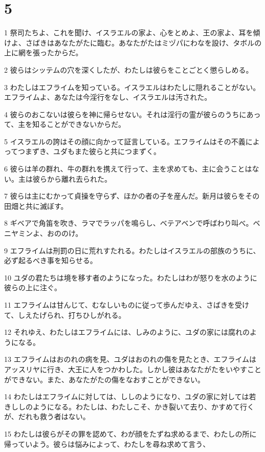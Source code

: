 \chapter{5}

\par 1 祭司たちよ、これを聞け、イスラエルの家よ、心をとめよ、王の家よ、耳を傾けよ、さばきはあなたがたに臨む。あなたがたはミヅパにわなを設け、タボルの上に網を張ったからだ。
\par 2 彼らはシッテムの穴を深くしたが、わたしは彼らをことごとく懲らしめる。
\par 3 わたしはエフライムを知っている。イスラエルはわたしに隠れることがない。エフライムよ、あなたは今淫行をなし、イスラエルは汚された。
\par 4 彼らのおこないは彼らを神に帰らせない。それは淫行の霊が彼らのうちにあって、主を知ることができないからだ。
\par 5 イスラエルの誇はその顔に向かって証言している。エフライムはその不義によってつまずき、ユダもまた彼らと共につまずく。
\par 6 彼らは羊の群れ、牛の群れを携えて行って、主を求めても、主に会うことはない。主は彼らから離れ去られた。
\par 7 彼らは主にむかって貞操を守らず、ほかの者の子を産んだ。新月は彼らをその田畑と共に滅ぼす。
\par 8 ギベアで角笛を吹き、ラマでラッパを鳴らし、ベテアベンで呼ばわり叫べ。ベニヤミンよ、おののけ。
\par 9 エフライムは刑罰の日に荒れすたれる。わたしはイスラエルの部族のうちに、必ず起るべき事を知らせる。
\par 10 ユダの君たちは境を移す者のようになった。わたしはわが怒りを水のように彼らの上に注ぐ。
\par 11 エフライムは甘んじて、むなしいものに従って歩んだゆえ、さばきを受けて、しえたげられ、打ちひしがれる。
\par 12 それゆえ、わたしはエフライムには、しみのように、ユダの家には腐れのようになる。
\par 13 エフライムはおのれの病を見、ユダはおのれの傷を見たとき、エフライムはアッスリヤに行き、大王に人をつかわした。しかし彼はあなたがたをいやすことができない。また、あなたがたの傷をなおすことができない。
\par 14 わたしはエフライムに対しては、ししのようになり、ユダの家に対しては若きししのようになる。わたしは、わたしこそ、かき裂いて去り、かすめて行くが、だれも救う者はない。
\par 15 わたしは彼らがその罪を認めて、わが顔をたずね求めるまで、わたしの所に帰っていよう。彼らは悩みによって、わたしを尋ね求めて言う、

